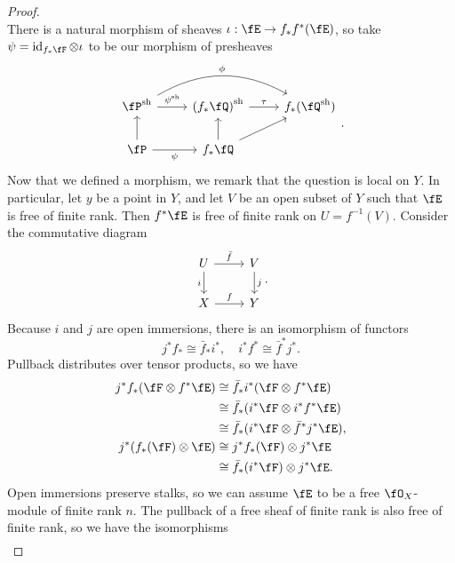 \documentclass[a4paper]{article}
\begin{document}
\begin{enumerate} [label=\textbf{\arabic*.}, leftmargin=0em]
\begin{proof}
\begin{equation*}
          \end{equation*}
          There is a natural morphism of sheaves $\iota : \fE \to f_*f^*(\fE)$, so take $\psi = \id_{f_*\fF} \otimes \iota$ to be our morphism of presheaves
          \[ \begin{tikzcd}
              \sh{\fP} \arrow[r, "\sh{\psi}"] \arrow[rr, "\phi", bend left] & \sh{(f_*\fQ)} \arrow[r, "\tau"] & f_*(\sh{\fQ}) \\
              \fP \arrow[r, "\psi"'] \arrow[u]                              & f_*\fQ \arrow[u] \arrow[ru]     &
            \end{tikzcd}. \]
          Now that we defined a morphism, we remark that the question is local on $Y$.
          In particular, let $y$ be a point in $Y$, and let $V$ be an open subset of $Y$ such that $\fE$ is free of finite rank.
          Then $f^*\fE$ is free of finite rank on $U = f^{-1}(V)$.
          Consider the commutative diagram
          \[ \begin{tikzcd}
              U \arrow[r, "\bar{f}"] \arrow[d, "i"'] & V \arrow[d, "j"] \\
              X \arrow[r, "f"]                       & Y
            \end{tikzcd}. \]
          Because $i$ and $j$ are open immersions, there is an isomorphism of functors
          \begin{equation*}
            j^*f_* \cong \bar{f}_*i^*, \quad i^*f^* \cong \bar{f}^*j^*.
          \end{equation*}
          Pullback distributes over tensor products, so we have
          \begin{align*}
            j^*f_*(\fF \otimes f^*\fE) & \cong \bar{f}_*i^*(\fF \otimes f^*\fE)           \\
                                       & \cong \bar{f}_*(i^*\fF \otimes i^*f^*\fE)        \\
                                       & \cong \bar{f}_*(i^*\fF \otimes \bar{f}^*j^*\fE), \\
            j^*(f_*(\fF) \otimes \fE)  & \cong j^*f_*(\fF) \otimes j^*\fE                 \\
                                       & \cong \bar{f}_*(i^*\fF) \otimes j^*\fE.
          \end{align*}
          Open immersions preserve stalks, so we can assume $\fE$ to be a free $\fO_X$-module of finite rank $n$.
          The pullback of a free sheaf of finite rank is also free of finite rank, so we have the isomorphisms
          \begin{align*}

\end{align*}
\end{proof}
\end{enumerate}
\end{document}

